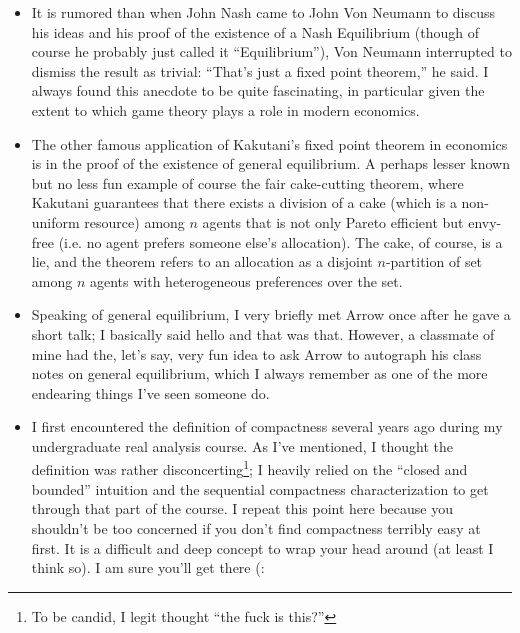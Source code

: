 \documentclass{article}
\begin{document}
\begin{itemize}[label=$\bullet$]
  \item It is rumored than when John Nash came to John Von Neumann to discuss his ideas and his proof of the existence of a Nash Equilibrium (though of course he probably just called it ``Equilibrium''), Von Neumann interrupted to dismiss the result as trivial: ``That's just a fixed point theorem,'' he said. I always found this anecdote to be quite fascinating, in particular given the extent to which game theory plays a role in modern economics.

  \item The other famous application of Kakutani's fixed point theorem in economics is in the proof of the existence of general equilibrium. A perhaps lesser known but no less fun example of course the fair cake-cutting theorem, where Kakutani guarantees that there exists a division of a cake (which is a non-uniform resource) among $n$ agents that is not only Pareto efficient but envy-free (i.e. no agent prefers someone else's allocation). The cake, of course, is a lie, and the theorem refers to an allocation as a disjoint $n$-partition of set among $n$ agents with heterogeneous preferences over the set.

  \item Speaking of general equilibrium, I very briefly met Arrow once after he gave a short talk; I basically said hello and that was that. However, a classmate of mine had the, let's say, very fun idea to ask Arrow to autograph his class notes on general equilibrium, which I always remember as one of the more endearing things I've seen someone do.

  \item I first encountered the definition of compactness several years ago during my undergraduate real analysis course. As I've mentioned, I thought the definition was rather disconcerting\footnote{To be candid, I legit thought ``the fuck is this?''}; I heavily relied on the ``closed and bounded'' intuition and the sequential compactness characterization to get through that part of the course. I repeat this point here because you shouldn't be too concerned if you don't find compactness terribly easy at first. It is a difficult and deep concept to wrap your head around (at least I think so). I am sure you'll get there (:
\end{itemize}

\clearpage

\setcounter{subsection}{0}
\renewcommand\thesubsection{\Alph{subsection}}
\titleformat{\subsection}[display]{
  \Large\bfseries
}{Appendix \thesubsection. #1}{0pt}{\vspace{-24pt}}
\renewcommand\thesubsubsection{\Alph{subsection}.\arabic{subsubsection}}
\end{document}
